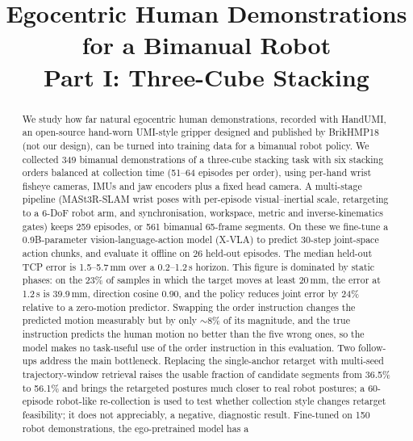 \documentclass[conference,10pt]{IEEEtran}
\newcommand{\mm}{\,mm\xspace}
\begin{document}
\title{Egocentric Human Demonstrations for a Bimanual Robot\\Part I: Three-Cube Stacking}
\author{
}
\maketitle

\begin{abstract}
We study how far natural egocentric human demonstrations, recorded with HandUMI, an open-source hand-worn UMI-style gripper designed and published by BrikHMP18 (not our design), can be turned into
training data for a bimanual robot policy. We collected 349 bimanual demonstrations of a three-cube stacking task with six
stacking orders balanced at collection time (51--64 episodes per order), using per-hand wrist fisheye cameras, IMUs and jaw
encoders plus a fixed head camera. A multi-stage pipeline (MASt3R-SLAM wrist poses with per-episode visual--inertial scale,
retargeting to a 6-DoF robot arm, and synchronisation, workspace, metric and inverse-kinematics gates) keeps 259 episodes, or
561 bimanual 65-frame segments. On these we fine-tune a 0.9B-parameter vision-language-action model (X-VLA) to predict 30-step
joint-space action chunks, and evaluate it offline on 26 held-out episodes. The median held-out TCP error is 1.5--5.7\mm over a
0.2--1.2\,s horizon. This figure is dominated by static phases: on the 23\% of samples in which the target moves at least
20\mm, the error at 1.2\,s is 39.9\mm, direction cosine 0.90, and the policy reduces joint error by 24\% relative to a
zero-motion predictor. Swapping the order instruction changes the predicted motion measurably but by only ${\sim}8\%$ of its
magnitude, and the true instruction predicts the human motion no better than the five wrong ones, so the model makes no
task-useful use of the order instruction in this evaluation.
Two follow-ups address the main bottleneck. Replacing the single-anchor retarget with multi-seed trajectory-window
retrieval raises the usable fraction of candidate segments from 36.5\% to 56.1\% and brings the retargeted postures
much closer to real robot postures; a 60-episode robot-like re-collection is used to test whether collection style changes
retarget feasibility; it does not appreciably, a negative, diagnostic result. Fine-tuned on 150 robot demonstrations, the ego-pretrained model has a

\end{abstract}
\end{document}

